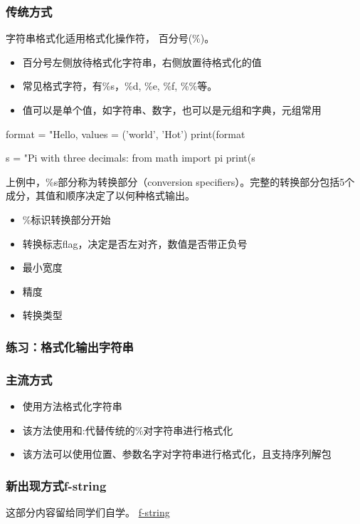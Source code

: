 \subsubsection{传统方式}
字符串格式化适用格式化操作符， 百分号(\%)。
\begin{itemize}
\item 百分号左侧放待格式化字符串，右侧放置待格式化的值
\item 常见格式字符，有\%s，\%d, \%e, \%f, \%\%等。
\item 值可以是单个值，如字符串、数字，也可以是元组和字典，元组常用
\end{itemize}
\begin{python}
format = "Hello, %
values = ('world', 'Hot')
print(format %

s = "Pi with three decimals: %
from math import pi
print(s %
\end{python}
上例中，\%s部分称为转换部分（conversion specifiers）。完整的转换部分包括5个成分，其值和顺序决定了以何种格式输出。
\begin{itemize}
\item \%标识转换部分开始
\item 转换标志flag，决定是否左对齐，数值是否带正负号
\item 最小宽度
\item 精度
\item 转换类型
\end{itemize}
\subsubsection{练习：格式化输出字符串}
\subsubsection{主流方式}
\begin{itemize}
\item 使用方法格式化字符串
\item 该方法使用{}和:代替传统的\%对字符串进行格式化
\item 该方法可以使用位置、参数名字对字符串进行格式化，且支持序列解包
\end{itemize}
\subsubsection{新出现方式f-string}
这部分内容留给同学们自学。
\href{https://docs.python.org/3/reference/lexical_analysis.html#f-strings}{f-string}
